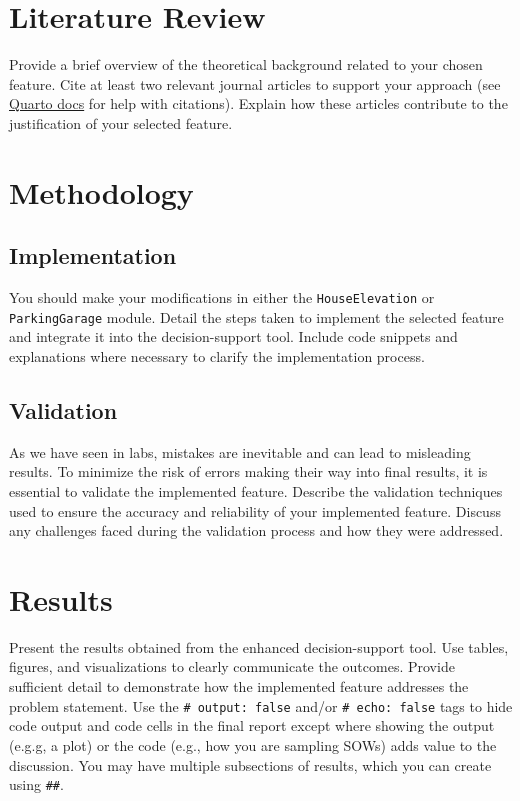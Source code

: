 \documentclass[
  11pt,
]{article}
\begin{document}
\section{Literature Review}\label{literature-review}

Provide a brief overview of the theoretical background related to your
chosen feature. Cite at least two relevant journal articles to support
your approach (see
\href{https://quarto.org/docs/authoring/footnotes-and-citations.html}{Quarto
docs} for help with citations). Explain how these articles contribute to
the justification of your selected feature.

\section{Methodology}\label{methodology}

\subsection{Implementation}\label{implementation}

You should make your modifications in either the \texttt{HouseElevation}
or \texttt{ParkingGarage} module. Detail the steps taken to implement
the selected feature and integrate it into the decision-support tool.
Include code snippets and explanations where necessary to clarify the
implementation process.

\subsection{Validation}\label{validation}

As we have seen in labs, mistakes are inevitable and can lead to
misleading results. To minimize the risk of errors making their way into
final results, it is essential to validate the implemented feature.
Describe the validation techniques used to ensure the accuracy and
reliability of your implemented feature. Discuss any challenges faced
during the validation process and how they were addressed.

\section{Results}\label{results}

Present the results obtained from the enhanced decision-support tool.
Use tables, figures, and visualizations to clearly communicate the
outcomes. Provide sufficient detail to demonstrate how the implemented
feature addresses the problem statement. Use the
\texttt{\#\textbar{}\ output:\ false} and/or
\texttt{\#\textbar{}\ echo:\ false} tags to hide code output and code
cells in the final report except where showing the output (e.g.g, a
plot) or the code (e.g., how you are sampling SOWs) adds value to the
discussion. You may have multiple subsections of results, which you can
create using \texttt{\#\#}.
\end{document}
